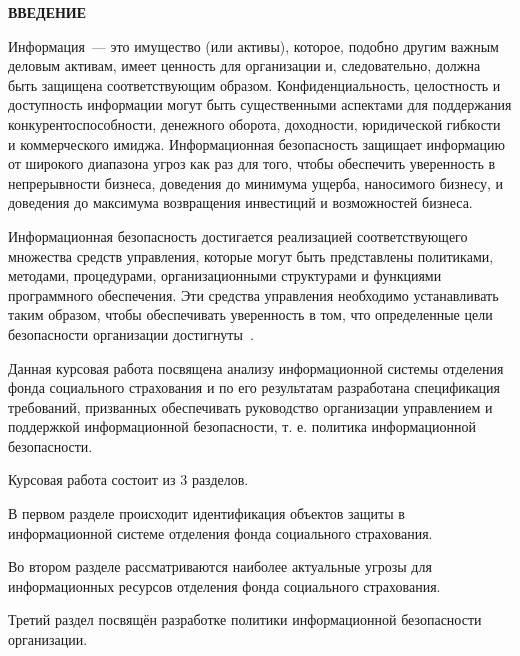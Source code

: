 \newpage

\begin{center}
  \Large{\textbf{ВВЕДЕНИЕ}}
\end{center}

Информация~--- это имущество (или активы), которое, подобно другим
важным деловым активам, имеет ценность для организации и,
следовательно, должна быть защищена соответствующим
образом. Конфиденциальность, целостность и доступность информации
могут быть существенными аспектами для поддержания
конкурентоспособности, денежного оборота, доходности, юридической
гибкости и коммерческого имиджа. Информационная безопасность защищает
информацию от широкого диапазона угроз как раз для того, чтобы
обеспечить уверенность в непрерывности бизнеса, доведения до минимума
ущерба, наносимого бизнесу, и доведения до максимума возвращения
инвестиций и возможностей бизнеса.

Информационная безопасность достигается реализацией соответствующего
множества средств управления, которые могут быть \linebreak представлены
политиками, методами, процедурами, организационными структурами и
функциями программного обеспечения. Эти средства управления необходимо
устанавливать таким образом, чтобы обеспечивать уверенность в том, что
определенные цели безопасности организации достигнуты~\cite{1}.

Данная курсовая работа посвящена анализу информационной системы
отделения фонда социального страхования и по его результатам
разработана спецификация требований, призванных обеспечивать
руководство организации управлением и поддержкой информационной
безопасности, т. е. политика информационной безопасности.

Курсовая работа состоит из 3 разделов.

В первом разделе происходит идентификация объектов защиты в
информационной системе отделения фонда социального страхования.

Во втором разделе рассматриваются наиболее актуальные угрозы для
информационных ресурсов отделения фонда социального страхования.

Третий раздел посвящён разработке политики информационной безопасности
организации.

\newpage

